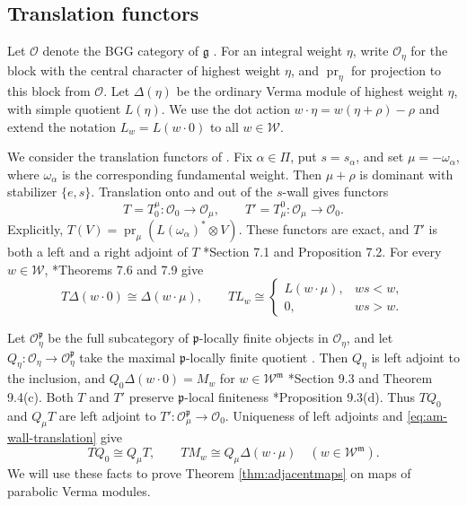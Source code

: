 \documentclass[12pt]{amsart}
\newcommand{\mc}[1]{\mathcal{#1}}
\theoremstyle{definition}
\numberwithin{equation}{section}
\newcommand{\g}{\mathfrak g}
\newcommand{\m}{\mathfrak m}
\newcommand{\p}{\mathfrak p}
\newcommand{\W}{\mathscr W}
\begin{document}
\subsection{Translation functors}\label{subsec:am-translation}

Let $\mathcal O$ denote the BGG category of $\g$ \cite{HumphreysO}. For an integral
weight $\eta$, write $\mathcal O_\eta$ for the block with the
central character of highest weight $\eta$, and
$\operatorname{pr}_\eta$ for projection to this block from $\mc{O}$.
Let $\Delta(\eta)$ be the ordinary Verma module of highest
weight $\eta$, with simple quotient $L(\eta)$.
We use the dot action $w\cdot\eta=w(\eta+\rho)-\rho$ and
extend the notation $L_w=L(w\cdot0)$ to all $w\in\W$.

We consider the translation functors of \cite[Chapter 7]{HumphreysO}. Fix $\alpha\in\Pi$, put $s=s_\alpha$, and set
$\mu=-\omega_\alpha$, where $\omega_\alpha$ is the corresponding
fundamental weight. Then $\mu+\rho$ is dominant with stabilizer
$\{e,s\}$. Translation onto and out of the $s$-wall gives functors
\begin{equation}
T=T_0^\mu:\mathcal O_0\longrightarrow\mathcal O_\mu,
\qquad
T'=T_\mu^0:\mathcal O_\mu\longrightarrow\mathcal O_0.
\end{equation}
Explicitly, $T(V)=\operatorname{pr}_\mu(L(\omega_\alpha)^*\otimes V)$.
These functors are exact, and $T'$ is both a left and a right
adjoint of $T$ \cite{HumphreysO}*{Section 7.1 and Proposition 7.2}.
For every $w\in\W$, \cite{HumphreysO}*{Theorems 7.6 and 7.9} give
\begin{equation}\label{eq:am-wall-translation}
 T\Delta(w\cdot0)\cong\Delta(w\cdot\mu),\qquad
 TL_w\cong
 \begin{cases}
 L(w\cdot\mu),&ws<w,\\
 0,&ws>w.
 \end{cases}
\end{equation}

Let $\mathcal O_\eta^{\p}$ be the full subcategory of
$\p$-locally finite objects in $\mathcal O_\eta$, and let
$Q_\eta:\mathcal O_\eta\to\mathcal O_\eta^{\p}$ take the maximal
$\p$-locally finite quotient \cite[Chapter 9]{HumphreysO}. Then $Q_\eta$ is left adjoint to
the inclusion, and $Q_0\Delta(w\cdot0)=M_w$ for $w\in\W^{\m}$
\cite{HumphreysO}*{Section 9.3 and Theorem 9.4(c)}.
Both $T$ and $T'$ preserve $\p$-local finiteness
\cite{HumphreysO}*{Proposition 9.3(d)}. Thus $TQ_0$ and
$Q_\mu T$ are left adjoint to $T':\mathcal O_\mu^{\p}\to\mathcal O_0$.
Uniqueness of left adjoints and \eqref{eq:am-wall-translation} give
\begin{equation}\label{eq:am-parabolic-translation}
 TQ_0\cong Q_\mu T,\qquad
 TM_w\cong Q_\mu\Delta(w\cdot\mu)
 \quad(w\in\W^{\m}).
\end{equation}
We will use these facts to prove Theorem \ref{thm:adjacentmaps} on maps of parabolic Verma modules.
\end{document}

